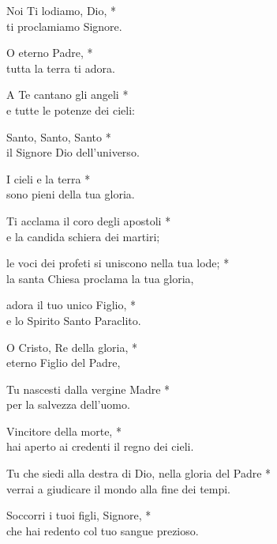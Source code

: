 
\setcounter{numstrofa}{0}

Noi Ti lodiamo, Dio, *\\
ti proclamiamo Signore.

\spazio

O eterno Padre, *\\
tutta la terra ti adora.

\spazio

A Te cantano gli angeli *\\
e tutte le potenze dei cieli:

\spazio

Santo, Santo, Santo *\\
il Signore Dio dell'universo.

\spazio

I cieli e la terra *\\
sono pieni della tua gloria.

\spazio

Ti acclama il coro degli apostoli *\\
e la candida schiera dei martiri;

\spazio

le voci dei profeti si uniscono nella tua lode; *\\
la santa Chiesa proclama la tua gloria,

\spazio

adora il tuo unico Figlio, *\\
e lo Spirito Santo Paraclito.

\spazio

O Cristo, Re della gloria, *\\
eterno Figlio del Padre,

\spazio

Tu nascesti dalla vergine Madre *\\
per la salvezza dell'uomo.

\spazio

Vincitore della morte, *\\
hai aperto ai credenti il regno dei cieli.

\spazio

Tu che siedi alla destra di Dio, nella gloria del Padre *\\
verrai a giudicare il mondo alla fine dei tempi.

\spazio

Soccorri i tuoi figli, Signore, *\\
che hai redento col tuo sangue prezioso.

